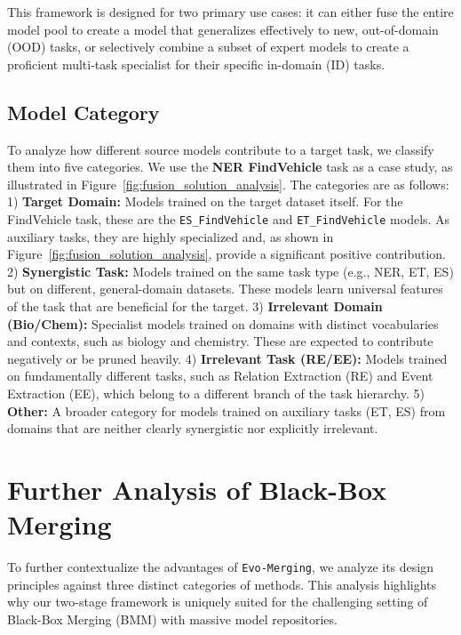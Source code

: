 This framework is designed for two primary use cases: it can either fuse the entire model pool to create a model that generalizes effectively to new, out-of-domain (OOD) tasks, or selectively combine a subset of expert models to create a proficient multi-task specialist for their specific in-domain (ID) tasks.

\subsection*{Model Category}
To analyze how different source models contribute to a target task, we classify them into five categories. We use the \textbf{NER FindVehicle} task as a case study, as illustrated in Figure~\ref{fig:fusion_solution_analysis}. The categories are as follows:
1) \textbf{Target Domain:} Models trained on the target dataset itself. For the FindVehicle task, these are the \texttt{ES\_FindVehicle} and \texttt{ET\_FindVehicle} models. As auxiliary tasks, they are highly specialized and, as shown in Figure~\ref{fig:fusion_solution_analysis}, provide a significant positive contribution.
2) \textbf{Synergistic Task:} Models trained on the same task type (e.g., NER, ET, ES) but on different, general-domain datasets. These models learn universal features of the task that are beneficial for the target.
3) \textbf{Irrelevant Domain (Bio/Chem):} Specialist models trained on domains with distinct vocabularies and contexts, such as biology and chemistry. These are expected to contribute negatively or be pruned heavily.
4) \textbf{Irrelevant Task (RE/EE):} Models trained on fundamentally different tasks, such as Relation Extraction (RE) and Event Extraction (EE), which belong to a different branch of the task hierarchy.
5) \textbf{Other:} A broader category for models trained on auxiliary tasks (ET, ES) from domains that are neither clearly synergistic nor explicitly irrelevant.

\section{Further Analysis of Black-Box Merging}
\label{sec:more_analysis}

To further contextualize the advantages of \texttt{Evo-Merging}, we analyze its design principles against three distinct categories of methods. This analysis highlights why our two-stage framework is uniquely suited for the challenging setting of Black-Box Merging (BMM) with massive model repositories.

